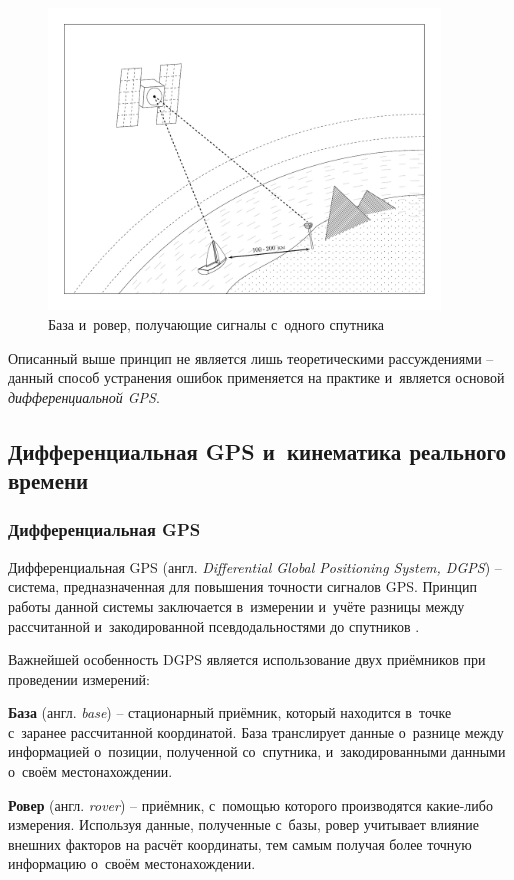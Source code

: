 \begin{figure}[h!]
  \centering
  \setlength{\fboxsep}{5pt}
  \includegraphics[height=8cm]{img/tikz/dgps-one/pic}
  \caption{База и~ровер, получающие сигналы с~одного спутника}\label{fig:dgps-one}
\end{figure}

Описанный выше принцип не является лишь теоретическими рассуждениями -- данный способ устранения ошибок применяется на практике и~является основой \emph{дифференциальной GPS}.

\subsection{Дифференциальная GPS и~кинематика реального времени}

\subsubsection{Дифференциальная GPS}

Дифференциальная GPS (англ. \emph{Differential Global Positioning System, DGPS}) -- система, предназначенная для повышения точности сигналов GPS. Принцип работы данной системы заключается в~измерении и~учёте разницы между рассчитанной и~закодированной псевдодальностями до спутников \cite{Trimble}. \par

Важнейшей особенность DGPS является использование двух приёмников при проведении измерений:

\begin{dashitemize}
  \item \textbf{База} (англ. \emph{base}) -- стационарный приёмник, который находится в~точке с~заранее рассчитанной координатой. База транслирует данные о~разнице между информацией о~позиции, полученной со~спутника, и~закодированными данными о~своём местонахождении.
  \item \textbf{Ровер} (англ. \emph{rover}) -- приёмник, с~помощью которого производятся какие-либо измерения. Используя данные, полученные с~базы, ровер учитывает влияние внешних факторов на расчёт координаты, тем самым получая более точную информацию о~своём местонахождении.
\end{dashitemize}

